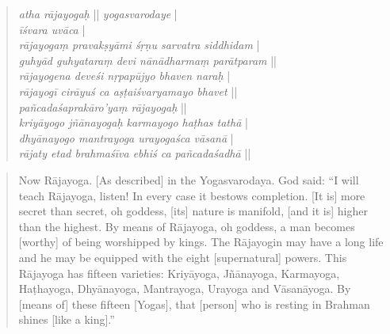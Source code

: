 \begin{quote}
\textit{atha rājayogaḥ} || \textit{yogasvarodaye} |\\
\textit{īśvara uvāca} |\\
\textit{rājayogaṃ pravakṣyāmi śṛṇu sarvatra siddhidam} |\\
\textit{guhyād guhyataraṃ devi nānādharmaṃ parātparam} ||\\
\textit{rājayogena deveśi nṛpapūjyo bhaven naraḥ} |\\
\textit{rājayogī cirāyuś ca aṣṭaiśvaryamayo bhavet} ||\\
\textit{pañcadaśaprakāro'yaṃ rājayogaḥ} ||\\
\textit{kriyāyogo jñānayogaḥ karmayogo haṭhas tathā} |\\
\textit{dhyānayogo mantrayoga urayogaśca vāsanā} |\\
\textit{rājaty etad brahmaśīva ebhiś ca pañcadaśadhā} ||\\
\end{quote}

\begin{quote}
Now Rājayoga. [As described] in the Yogasvarodaya.
God said:
``I will teach Rājayoga, listen! In every case it bestows completion.
[It is] more secret than secret, oh goddess, [its] nature is manifold, [and it is] higher than the highest. 
By means of Rājayoga, oh goddess, a man becomes [worthy] of being worshipped by kings.
The Rājayogin may have a long life and he may be equipped with the eight [supernatural] powers.
This Rājayoga has fifteen varieties: Kriyāyoga, Jñānayoga, Karmayoga, Haṭhayoga,
Dhyānayoga, Mantrayoga, Urayoga and Vāsanāyoga.
By [means of] these fifteen [Yogas], that [person] who is resting in Brahman shines [like a king].''
\end{quote}

